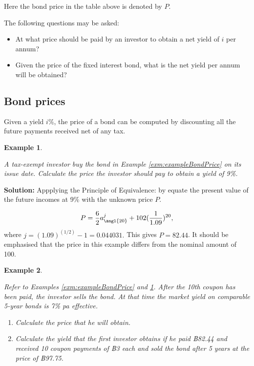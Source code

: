 \documentclass[landscape, 20pt]{extreport}
\theoremstyle{definition}
\theoremstyle{definition}
\newtheorem{example}{Example}[chapter]
\theoremstyle{definition}
\theoremstyle{definition}
\theoremstyle{remark}
\begin{document}
Here the bond price in the table above is denoted by \(P\).

The following questions may be asked:

\begin{itemize}
\item
  At what price should be paid by an investor to obtain a net yield of
  \(i\) per annum?
\item
  Given the price of the fixed interest bond, what is the net yield
  per annum will be obtained?
\end{itemize}

\hypertarget{bond-prices}{%
\subsection{Bond prices}\label{bond-prices}}

Given a yield \(i\%\), the price of a bond can be computed by discounting
all the future payments received net of any tax.

\newpage \begin{example}
\protect\hypertarget{exm:exampleBondPrice2}{}\label{exm:exampleBondPrice2}

\emph{A tax-exempt investor buy the bond in Example \ref{exm:exampleBondPrice} on its issue date. Calculate the price the
investor should pay to obtain a yield of 9\%.}

\end{example}

\textbf{Solution:}
Appplying the Principle of Equivalence: by equate the present value of the future incomes at 9\% with the unknown price \(P\).

\[P = \frac{6}{2} a^j_{\angl{20}} + 102 (\frac{1}{1.09})^{20},\]
where \(j = (1.09)^{(1/2)} - 1 = 0.044031.\)
This gives \(P = 82.44\). It should be emphasised that the price in this example differs from the nominal amount of 100.

\newpage \begin{example}
\protect\hypertarget{exm:unlabeled-div-48}{}\label{exm:unlabeled-div-48}

\emph{Refer to Examples
\ref{exm:exampleBondPrice} and
\ref{exm:exampleBondPrice2}. After the 10th coupon has been paid, the
investor sells the bond. At that time the market yield on comparable
5-year bonds is 7\% pa effective.}

\begin{enumerate}
\def\labelenumi{\arabic{enumi}.}
\item
  \emph{Calculate the price that he will obtain.}
\item
  \emph{Calculate the yield that the first investor obtains if he paid
  ฿82.44 and received 10 coupon payments of ฿3 each and sold the bond
  after 5 years at the price of ฿97.75.}
\end{enumerate}

\end{example}
\end{document}
